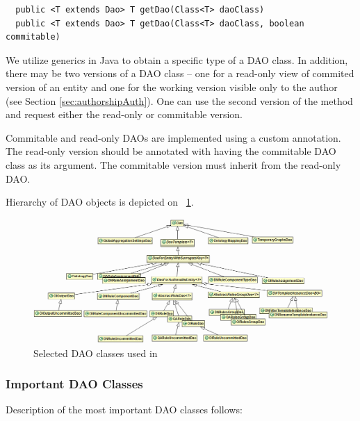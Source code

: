 \begin{description}[style=nextline,font=\ttfamily]
\begin{verbatim}
  public <T extends Dao> T getDao(Class<T> daoClass)
  public <T extends Dao> T getDao(Class<T> daoClass, boolean commitable)
\end{verbatim}

We utilize generics in Java to obtain a specific type of a DAO class. In addition, there may be two versions of a DAO class -- one for a read-only view of commited version of an entity and one for the working version visible only to the author (see Section \ref{sec:authorshipAuth}). One can use the second version of the  method and request either the read-only or commitable version.

Commitable and read-only DAOs are implemented using a custom  annotation. The read-only version should be annotated with  having the commitable DAO class as its argument. The commitable version must inherit from the read-only DAO.

Hierarchy of DAO objects is depicted on \figurename~\ref{fig:feDAO}.

\begin{figure}[htb]
    \centering
    \includegraphics[width=1.05\textwidth]{images/dia-fe-dao.png}
    \caption{Selected DAO classes used in \FE}
	\label{fig:feDAO}
\end{figure}

\subsubsection{Important DAO Classes}
Description of the most important DAO classes follows:


\end{description}

